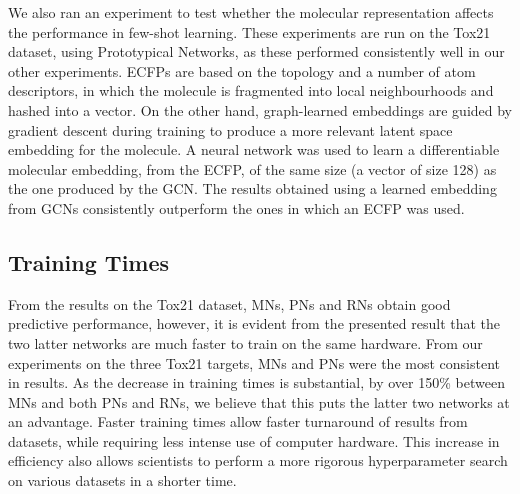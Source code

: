 We also ran an experiment to test whether the molecular representation affects the performance in few-shot learning. These experiments are run on the Tox21 dataset, using Prototypical Networks, as these performed consistently well in our other experiments. ECFPs are based on the topology and a number of atom descriptors, in which the molecule is fragmented into local neighbourhoods and hashed into a vector. On the other hand, graph-learned embeddings are guided by gradient descent during training to produce a more relevant latent space embedding for the molecule. A neural network was used to learn a differentiable molecular embedding, from the ECFP, of the same size (a vector of size 128) as the one produced by the GCN. The results obtained using a learned embedding from GCNs consistently outperform the ones in which an ECFP was used.

\subsection{Training Times}

From the results on the Tox21 dataset, MNs, PNs and RNs obtain good predictive performance, however, it is evident from the presented result that the two latter networks are much faster to train on the same hardware. From our experiments on the three Tox21 targets, MNs and PNs were the most consistent in results. As the decrease in training times is substantial, by over 150\% between MNs and both PNs and RNs, we believe that this puts the latter two networks at an advantage. Faster training times allow faster turnaround of results from datasets, while requiring less intense use of computer hardware. This increase in efficiency also allows scientists to perform a more rigorous hyperparameter search on various datasets in a shorter time.
